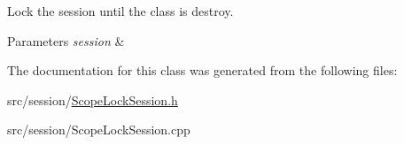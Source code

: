 Lock the session until the class is destroy. 


\begin{DoxyParams}{Parameters}
{\em session} & \\
\hline
\end{DoxyParams}


The documentation for this class was generated from the following files\-:\begin{DoxyCompactItemize}
\item 
src/session/\hyperlink{_scope_lock_session_8h}{Scope\-Lock\-Session.\-h}\item 
src/session/Scope\-Lock\-Session.\-cpp\end{DoxyCompactItemize}
